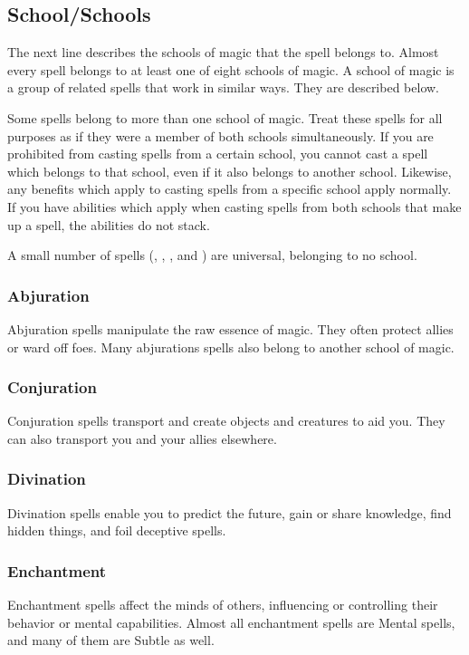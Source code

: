 \subsection{School/Schools}
The next line describes the schools of magic that the spell belongs to. Almost every spell belongs to at least one of eight schools of magic. A school of magic is a group of related spells that work in similar ways. They are described below.

Some spells belong to more than one school of magic. Treat these spells for all purposes as if they were a member of both schools simultaneously. If you are prohibited from casting spells from a certain school, you cannot cast a spell which belongs to that school, even if it also belongs to another school. Likewise, any benefits which apply to casting spells from a specific school apply normally. If you have abilities which apply when casting spells from both schools that make up a spell, the abilities do not stack.

A small number of spells (, , , and ) are universal, belonging to no school.

\subsubsection{Abjuration}
Abjuration spells manipulate the raw essence of magic. They often protect allies or ward off foes. Many abjurations spells also belong to another school of magic.

\subsubsection{Conjuration}
Conjuration spells transport and create objects and creatures to aid you. They can also transport you and your allies elsewhere.

\subsubsection{Divination}
Divination spells enable you to predict the future, gain or share knowledge, find hidden things, and foil deceptive spells.

\subsubsection{Enchantment}
Enchantment spells affect the minds of others, influencing or controlling their behavior or mental capabilities. Almost all enchantment spells are Mental spells, and many of them are Subtle as well.

